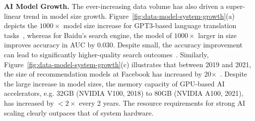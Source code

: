 \textbf{AI Model Growth.}
The ever-increasing data volume has also driven a super-linear trend in model size growth. 
Figure~\ref{fig:data-model-system-growth}(a) depicts the $1000\times$ model size increase for GPT3-based language translation tasks~\cite{Hernandez:arxiv:2020,brown:arxiv:2020}, whereas for Baidu's search engine, the model of $1000\times$ larger in size improves accuracy in AUC by 0.030. Despite small, the accuracy improvement can lead to significantly higher-quality search outcomes~\cite{g-search}. 
Similarly, Figure~\ref{fig:data-model-system-growth}(c) illustrates that between 2019 and 2021, the size of recommendation models at Facebook has increased by 20$\times$~\cite{Yi2018FactorizedDR,zhao2020distributed,lui2020understanding, Mudigere:scaling-training:2021}.
Despite the large increase in model sizes, the memory capacity of GPU-based AI accelerators, e.g. 32GB (NVIDIA V100, 2018) to 80GB (NVIDIA A100, 2021), has increased by $<2\times$ every 2 years.
The resource requirements for strong AI scaling clearly outpaces that of system hardware.


